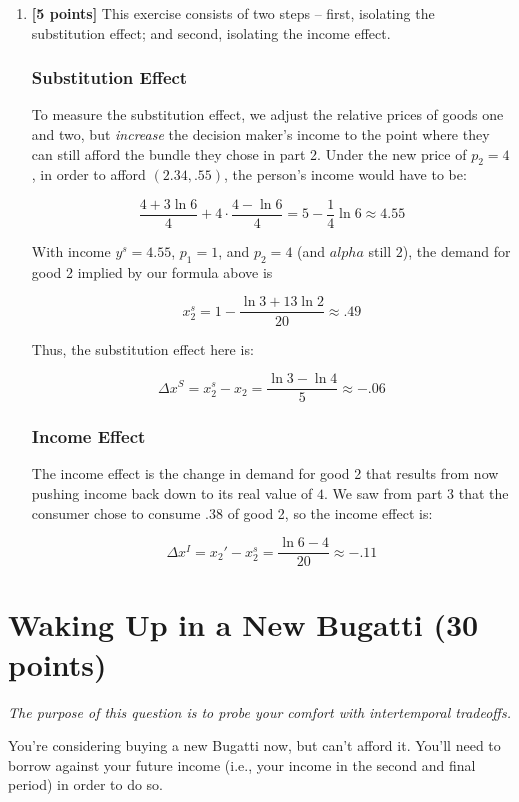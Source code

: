 \documentclass{article}
\newenvironment{solution}{\color{red}}{\color{black}}
\begin{document}
\begin{solution}
\begin{enumerate}
\item \textbf{[5 points]} This exercise consists of two steps -- first, isolating the substitution effect; and second, isolating the income effect.

\subsubsection*{Substitution Effect}

To measure the substitution effect, we adjust the relative prices of goods one and two, but \emph{increase} the decision maker's income to the point where they can still afford the bundle they chose in part 2. Under the new price of $p_2 = 4$, in order to afford $(2.34, .55)$, the person's income would have to be:

\[ \frac{4 + 3 \ln 6}4 + 4\cdot \frac{4 - \ln 6}4 = 5 - \frac14 \ln 6 \approx 4.55 \] 

With income $y^s = 4.55$, $p_1 = 1$, and $p_2 = 4$ (and $alpha$ still $2$), the demand for good 2 implied by our formula above is

\[ x_2^s = 1 - \frac{\ln 3 + 13 \ln 2}{20} \approx .49 \]

Thus, the substitution effect here is:

\[ \Delta x^S = x_2^s - x_2 = \frac{\ln 3 - \ln 4}{5} \approx -.06 \]

\subsubsection*{Income Effect}

The income effect is the change in demand for good 2 that results from now pushing income back down to its real value of $4$. We saw from part 3 that the consumer chose to consume $.38$ of good 2, so the income effect is:

\[ \Delta x^I = x_2' - x_2^s = \frac{\ln 6 - 4}{20} \approx -.11 \]
\end{enumerate}
\end{solution}

\section*{Waking Up in a New Bugatti (30 points)}

\small{\textit{The purpose of this question is to probe your comfort with intertemporal tradeoffs.}}

You're considering buying a new Bugatti now, but can't afford it. You'll need to borrow against your future income (i.e., your income in the second and final period) in order to do so.
\end{document}
